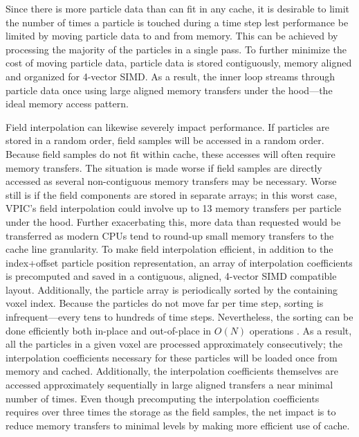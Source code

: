 \documentclass[10pt]{article}
\begin{document}
Since there is more particle data than can fit in any cache, it is
desirable to limit the number of times a particle is touched during a
time step lest performance be limited by moving particle data to and
from memory.  This can be achieved by processing the majority of the
particles in a single pass.  To further minimize the cost of moving
particle data, particle data is stored contiguously, memory aligned
and organized for 4-vector SIMD.  As a result, the inner loop streams
through particle data once using large aligned memory transfers under
the hood---the ideal memory access pattern.

Field interpolation can likewise severely impact performance.  If
particles are stored in a random order, field samples will be accessed
in a random order.  Because field samples do not fit within cache,
these accesses will often require memory transfers.  The situation is
made worse if field samples are directly accessed as several
non-contiguous memory transfers may be necessary.  Worse still is if the
field components are stored in separate arrays; in this worst case,
VPIC's field interpolation could involve up to 13 memory transfers per
particle under the hood.  Further exacerbating this, more data than
requested would be transferred as modern CPUs tend to round-up small
memory transfers to the cache line granularity.  To make field
interpolation efficient, in addition to the index+offset particle
position representation, an array of interpolation coefficients is
precomputed and saved in a contiguous, aligned, 4-vector SIMD
compatible layout.  Additionally, the particle array is periodically
sorted by the containing voxel index.  Because the particles do not
move far per time step, sorting is infrequent---every tens to hundreds
of time steps.  Nevertheless, the sorting can be done efficiently both
in-place and out-of-place in $O(N)$ operations \cite{Bowers_2001}.  As
a result, all the particles in a given voxel are processed
approximately consecutively; the interpolation coefficients necessary
for these particles will be loaded once from memory and cached.
Additionally, the interpolation coefficients themselves are accessed
approximately sequentially in large aligned transfers a near minimal
number of times.  Even though precomputing the interpolation
coefficients requires over three times the storage as the field
samples, the net impact is to reduce memory transfers to minimal
levels by making more efficient use of cache.

\end{document}
